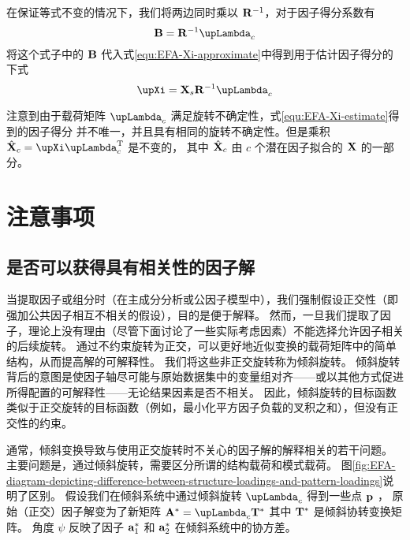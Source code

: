 在保证等式不变的情况下，我们将两边同时乘以 $ \mathbf{R}^{-1} $，对于因子得分系数有
\begin{equation}
    \vB = \vR^{-1}\vLambda_c
\end{equation}
将这个式子中的 $ \mathbf{B} $ 代入式\eqref{equ:EFA-Xi-approximate}中得到用于估计因子得分的下式
\begin{equation}\label{equ:EFA-Xi-estimate}
    \vXi = \vX_s \vR^{-1} \vLambda_c
\end{equation}

注意到由于载荷矩阵 $ \vLambda_c $ 满足旋转不确定性，式\eqref{equ:EFA-Xi-estimate}得到的因子得分
并不唯一，并且具有相同的旋转不确定性。但是乘积 $ \hat{\vX}_c = \vXi\vLambda_c\T $ 是不变的，
其中 $ \hat{\mathbf{X}}_c $ 由 $ c $ 个潜在因子拟合的 $ \mathbf{X} $ 的一部分。

\section{注意事项}

\subsection{是否可以获得具有相关性的因子解}

当提取因子或组分时（在主成分分析或公因子模型中），我们强制假设正交性（即强加公共因子相互不相关的假设），目的是便于解释。
然而，一旦我们提取了因子，理论上没有理由（尽管下面讨论了一些实际考虑因素）不能选择允许因子相关的后续旋转。
通过不约束旋转为正交，可以更好地近似变换的载荷矩阵中的简单结构，从而提高解的可解释性。
我们将这些非正交旋转称为倾斜旋转。
倾斜旋转背后的意图是使因子轴尽可能与原始数据集中的变量组对齐——或以其他方式促进所得配置的可解释性——无论结果因素是否不相关。
因此，倾斜旋转的目标函数类似于正交旋转的目标函数（例如，最小化平方因子负载的叉积之和），但没有正交性的约束。

通常，倾斜变换导致与使用正交旋转时不关心的因子解的解释相关的若干问题。
主要问题是，通过倾斜旋转，需要区分所谓的结构载荷和模式载荷。
图\ref{fig:EFA-diagram-depicting-difference-between-structure-loadings-and-pattern-loadings}说明了区别。
假设我们在倾斜系统中通过倾斜旋转 $ \vLambda_c $ 得到一些点 $ \mathbf{p} $ ，
原始（正交）因子解变为了新矩阵 $ \vA^* = \vLambda_c\vT^* $ 其中 $ \mathbf{T}^* $ 是倾斜协转变换矩阵。
角度 $ \psi $ 反映了因子 $ \mathbf{a}_1^* $ 和 $ \mathbf{a}_2^* $ 在倾斜系统中的协方差。


